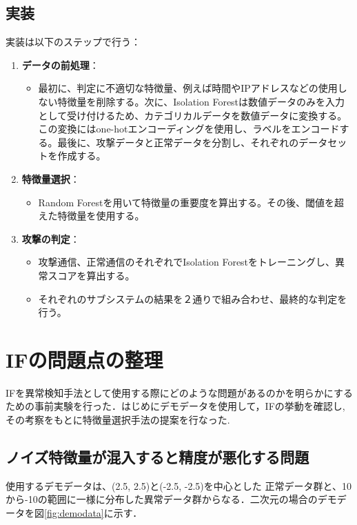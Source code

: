 \documentclass{css}
\begin{document}
\subsection{実装}
実装は以下のステップで行う：
\begin{enumerate}
    \item \textbf{データの前処理}：
        \begin{itemize}
            \item 最初に、判定に不適切な特徴量、例えば時間やIPアドレスなどの使用しない特徴量を削除する。次に、Isolation Forestは数値データのみを入力として受け付けるため、カテゴリカルデータを数値データに変換する。この変換にはone-hotエンコーディングを使用し、ラベルをエンコードする。最後に、攻撃データと正常データを分割し、それぞれのデータセットを作成する。
        \end{itemize}
    \item \textbf{特徴量選択}：
        \begin{itemize}
            \item Random Forestを用いて特徴量の重要度を算出する。その後、閾値を超えた特徴量を使用する。
        \end{itemize}
    \item \textbf{攻撃の判定}：
        \begin{itemize}
            \item 攻撃通信、正常通信のそれぞれでIsolation Forestをトレーニングし、異常スコアを算出する。
            \item それぞれのサブシステムの結果を２通りで組み合わせ、最終的な判定を行う。
        \end{itemize}
\end{enumerate}


\section{IFの問題点の整理}
IFを異常検知手法として使用する際にどのような問題があるのかを明らかにするための事前実験を行った．はじめにデモデータを使用して，IFの挙動を確認し,その考察をもとに特徴量選択手法の提案を行なった.

\subsection{ノイズ特徴量が混入すると精度が悪化する問題}
使用するデモデータは、(2.5, 2.5)と(-2.5, -2.5)を中心とした
正常データ群と、10から-10の範囲に一様に分布した異常データ群からなる．二次元の場合のデモデータを図\ref{fig:demodata}に示す．
\end{document}
